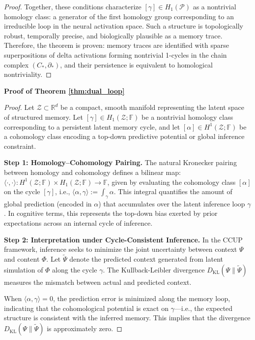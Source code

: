 \documentclass[lettersize,journal]{IEEEtran}
\begin{document}
\begin{proof}
Together, these conditions characterize \( [\gamma] \in H_1(\mathcal{P}) \) as a nontrivial homology class: a generator of the first homology group corresponding to an irreducible loop in the neural activation space. Such a structure is topologically robust, temporally precise, and biologically plausible as a memory trace.
Therefore, the theorem is proven: memory traces are identified with sparse superpositions of delta activations forming nontrivial 1-cycles in the chain complex \( (C_*, \partial_*) \), and their persistence is equivalent to homological nontriviality.
\end{proof}

\noindent\textbf{Proof of Theorem \ref{thm:dual_loop}}

\begin{proof}
Let \( \mathcal{Z} \subset \mathbb{R}^d \) be a compact, smooth manifold representing the latent space of structured memory. Let \( [\gamma] \in H_1(\mathcal{Z}; \mathbb{F}) \) be a nontrivial homology class corresponding to a persistent latent memory cycle, and let \( [\alpha] \in H^1(\mathcal{Z}; \mathbb{F}) \) be a cohomology class encoding a top-down predictive potential or global inference constraint.

\textbf{Step 1: Homology–Cohomology Pairing.}  
The natural Kronecker pairing between homology and cohomology defines a bilinear map:
$\langle \cdot, \cdot \rangle : H^1(\mathcal{Z}; \mathbb{F}) \times H_1(\mathcal{Z}; \mathbb{F}) \to \mathbb{F}$,
given by evaluating the cohomology class \( [\alpha] \) on the cycle \( [\gamma] \), i.e.,
$\langle \alpha, \gamma \rangle := \int_\gamma \alpha$.
This integral quantifies the amount of global prediction (encoded in \( \alpha \)) that accumulates over the latent inference loop \( \gamma \). In cognitive terms, this represents the top-down bias exerted by prior expectations across an internal cycle of inference.

\textbf{Step 2: Interpretation under Cycle-Consistent Inference.}  
In the CCUP framework, inference seeks to minimize the joint uncertainty between context \( \Psi \) and content \( \Phi \). Let \( \tilde{\Psi} \) denote the predicted context generated from latent simulation of \( \Phi \) along the cycle \( \gamma \). The Kullback-Leibler divergence
$D_{\mathrm{KL}}(\Psi \| \tilde{\Psi})$
measures the mismatch between actual and predicted context.

When \( \langle \alpha, \gamma \rangle = 0 \), the prediction error is minimized along the memory loop, indicating that the cohomological potential is exact on \( \gamma \)—i.e., the expected structure is consistent with the inferred memory. This implies that the divergence \( D_{\mathrm{KL}}(\Psi \| \tilde{\Psi}) \) is approximately zero.


\end{proof}
\end{document}
